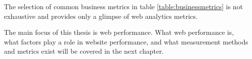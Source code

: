 


















The selection of common business metrics in table \ref{table:businessmetrics} is not exhaustive and provides only a glimpse of web analytics metrics.

The main focus of this thesis is web performance.
What web performance is, what factors play a role in website performance, and what measurement methods and metrics exist will be covered in the next chapter.


